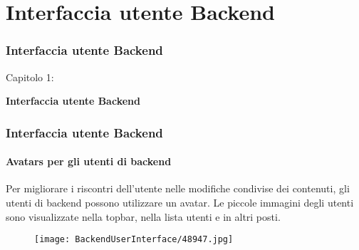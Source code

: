 %

\section{Interfaccia utente Backend}
\begin{frame}[fragile]
	\frametitle{Interfaccia utente Backend}

	\begin{center}\huge{Capitolo 1:}\end{center}
	\begin{center}\huge{\color{typo3darkgrey}\textbf{Interfaccia utente Backend}}\end{center}

\end{frame}

\begin{frame}[fragile]
	\frametitle{Interfaccia utente Backend}
	\framesubtitle{Avatars per gli utenti di backend}

	Per migliorare i riscontri dell'utente nelle modifiche condivise dei contenuti, gli utenti di backend possono utilizzare un avatar.
	Le piccole immagini degli utenti sono visualizzate nella topbar, nella lista utenti e in altri posti.

	\begin{figure}
		\texttt{[image: BackendUserInterface/48947.jpg]}
	\end{figure}

\end{frame}

